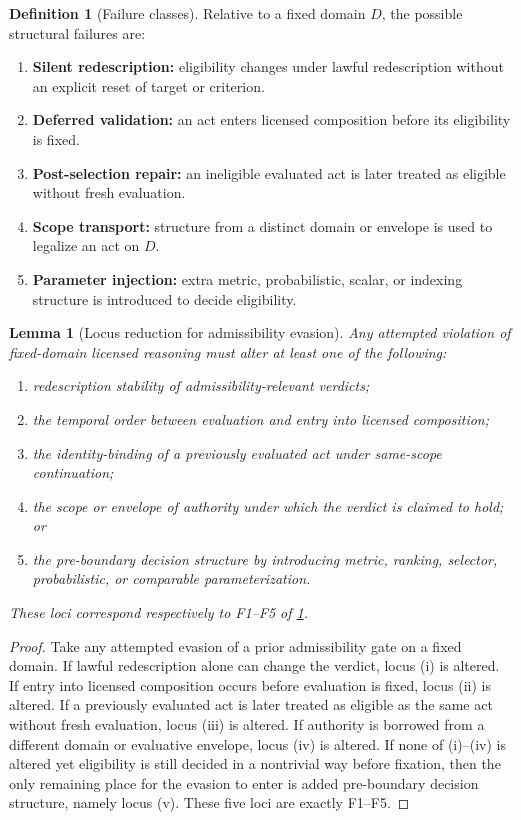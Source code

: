 \documentclass[11pt]{article}
\theoremstyle{plain}
\newtheorem{lemma}[theorem]{Lemma}
\theoremstyle{definition}
\newtheorem{definition}[theorem]{Definition}
\newcommand{\domain}{D}
\begin{document}
\begin{definition}[Failure classes]
\label{def:B-failure-classes}
Relative to a fixed domain $\domain$, the possible structural failures are:
\begin{enumerate}[label=F\arabic*., leftmargin=2.5em]
    \item \textbf{Silent redescription:} eligibility changes under lawful redescription without an explicit reset of target or criterion.
    \item \textbf{Deferred validation:} an act enters licensed composition before its eligibility is fixed.
    \item \textbf{Post-selection repair:} an ineligible evaluated act is later treated as eligible without fresh evaluation.
    \item \textbf{Scope transport:} structure from a distinct domain or envelope is used to legalize an act on $\domain$.
    \item \textbf{Parameter injection:} extra metric, probabilistic, scalar, or indexing structure is introduced to decide eligibility.
\end{enumerate}
\end{definition}

\begin{lemma}[Locus reduction for admissibility evasion]
\label{lem:B-locus}
Any attempted violation of fixed-domain licensed reasoning must alter at least one of the following:
\begin{enumerate}[label=(\roman*), leftmargin=2.5em]
    \item redescription stability of admissibility-relevant verdicts;
    \item the temporal order between evaluation and entry into licensed composition;
    \item the identity-binding of a previously evaluated act under same-scope continuation;
    \item the scope or envelope of authority under which the verdict is claimed to hold; or
    \item the pre-boundary decision structure by introducing metric, ranking, selector, probabilistic, or comparable parameterization.
\end{enumerate}
These loci correspond respectively to F1--F5 of \cref{def:B-failure-classes}.
\end{lemma}

\begin{proof}
Take any attempted evasion of a prior admissibility gate on a fixed domain. If lawful redescription alone can change the verdict, locus (i) is altered. If entry into licensed composition occurs before evaluation is fixed, locus (ii) is altered. If a previously evaluated act is later treated as eligible as the same act without fresh evaluation, locus (iii) is altered. If authority is borrowed from a different domain or evaluative envelope, locus (iv) is altered. If none of (i)--(iv) is altered yet eligibility is still decided in a nontrivial way before fixation, then the only remaining place for the evasion to enter is added pre-boundary decision structure, namely locus (v). These five loci are exactly F1--F5.
\end{proof}
\end{document}
